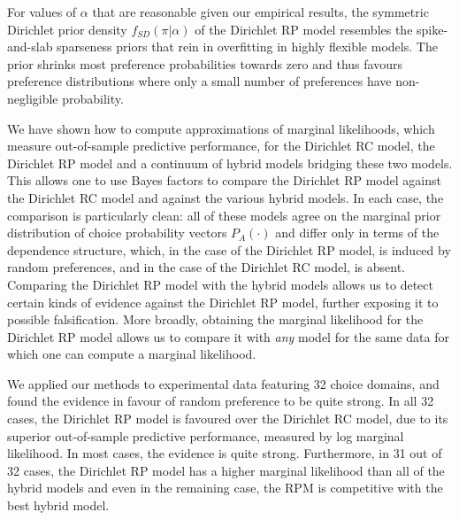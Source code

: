 \documentclass[11pt,letter]{article}
\newcommand{\Dpi}{Dirichlet RP model}
\newcommand{\DP}{Dirichlet RC model}
\begin{document}
For values of $\alpha$ that are reasonable given our empirical results, the symmetric Dirichlet prior density $f_{SD}(\pi|\alpha)$ of the \Dpi{} resembles the spike-and-slab sparseness priors that rein in overfitting in highly flexible models.
The prior shrinks most preference probabilities towards zero and thus favours preference distributions where only a small number of preferences have non-negligible probability.

We have shown how to compute approximations of marginal likelihoods, which measure out-of-sample predictive performance, for the \DP{}, the \Dpi{} and a continuum of hybrid models bridging these two models.
This allows one to use Bayes factors to compare the \Dpi{} against the \DP{} and against the various hybrid models.
In each case, the comparison is particularly clean: all of these models agree on the marginal prior distribution of choice probability vectors $P_A(\cdot)$ and differ only in terms of the dependence structure, which, in the case of the \Dpi{}, is induced by random preferences, and in the case of the \DP{}, is absent.
Comparing the \Dpi{} with the hybrid models allows us to detect certain kinds of evidence against the \Dpi{}, further exposing it to possible falsification.
More broadly, obtaining the marginal likelihood for the \Dpi{} allows us to compare it with {\em any} model for the same data for which one can compute a marginal likelihood.

We applied our methods to experimental data featuring 32 choice domains, and found the evidence in favour of random preference to be quite strong.
In all 32 cases, the \Dpi{} is favoured over the \DP{}, due to its superior out-of-sample predictive performance, measured by log marginal likelihood.
In most cases, the evidence is quite strong.
Furthermore, in 31 out of 32 cases, the \Dpi{} has a higher marginal likelihood than all of the hybrid models and even in the remaining case, the RPM is competitive with the best hybrid model.
\end{document}

